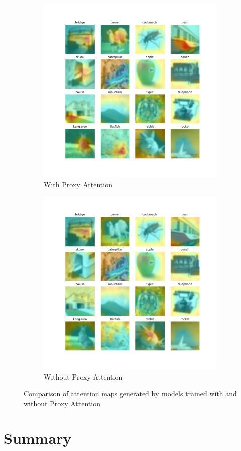 \begin{figure}[h]
    \centering
    \begin{subfigure}[b]{0.7\textwidth}
        \includegraphics[width=\textwidth]{images/proxy_2.pdf}
        \caption{With Proxy Attention}
        \label{fig:proxy3}
    \end{subfigure}
    \hfill
    \begin{subfigure}[b]{.7\textwidth}
        \includegraphics[width=\textwidth]{images/noproxy_2.pdf}
        \caption{Without Proxy Attention}
        \label{fig:noproxy3}
    \end{subfigure}
    \caption{Comparison of attention maps generated by models trained with and without Proxy Attention}
    \label{fig:attention3}
\end{figure}





\section{Summary}
